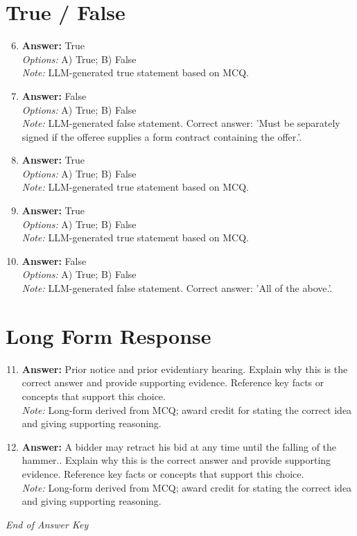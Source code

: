 \documentclass[12pt]{article}
\begin{document}
\section*{True / False}
\begin{enumerate}[label=\arabic*.]
\setcounter{enumi}{5}
\item \textbf{Answer:} True
\\ \textit{Options:} A) True; B) False
\\ \textit{Note:} LLM-generated true statement based on MCQ.
\item \textbf{Answer:} False
\\ \textit{Options:} A) True; B) False
\\ \textit{Note:} LLM-generated false statement. Correct answer: 'Must be separately signed if the offeree supplies a form contract containing the offer.'.
\item \textbf{Answer:} True
\\ \textit{Options:} A) True; B) False
\\ \textit{Note:} LLM-generated true statement based on MCQ.
\item \textbf{Answer:} True
\\ \textit{Options:} A) True; B) False
\\ \textit{Note:} LLM-generated true statement based on MCQ.
\item \textbf{Answer:} False
\\ \textit{Options:} A) True; B) False
\\ \textit{Note:} LLM-generated false statement. Correct answer: 'All of the above.'.
\end{enumerate}

\section*{Long Form Response}
\begin{enumerate}[label=\arabic*.]
\setcounter{enumi}{10}
\item \textbf{Answer:} Prior notice and prior evidentiary hearing. Explain why this is the correct answer and provide supporting evidence. Reference key facts or concepts that support this choice.
\\ \textit{Note:} Long-form derived from MCQ; award credit for stating the correct idea and giving supporting reasoning.
\item \textbf{Answer:} A bidder may retract his bid at any time until the falling of the hammer.. Explain why this is the correct answer and provide supporting evidence. Reference key facts or concepts that support this choice.
\\ \textit{Note:} Long-form derived from MCQ; award credit for stating the correct idea and giving supporting reasoning.
\end{enumerate}

\vfill
\noindent\textit{End of Answer Key}
\end{document}
